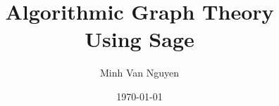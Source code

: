 \documentclass[a4paper,twoside,12pt]{book}
\begin{document}
\title{\Huge{\bf{Algorithmic Graph Theory \\
      Using Sage}}}
\author{\Large{Minh Van Nguyen}}
\date{\today}
\maketitle


\frontmatter
\setcounter{tocdepth}{1}
\tableofcontents
\listoffigures
\listoftables

\mainmatter






















\backmatter


\end{document}
